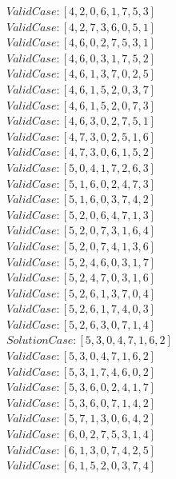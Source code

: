 \documentclass[a4paper,12pt]{article}
\begin{document}
				$Valid Case   : [4, 2, 0, 6, 1, 7, 5, 3]$\\
				$Valid Case   : [4, 2, 7, 3, 6, 0, 5, 1]$\\
				$Valid Case   : [4, 6, 0, 2, 7, 5, 3, 1]$\\
				$Valid Case   : [4, 6, 0, 3, 1, 7, 5, 2]$\\
				$Valid Case   : [4, 6, 1, 3, 7, 0, 2, 5]$\\
				$Valid Case   : [4, 6, 1, 5, 2, 0, 3, 7]$\\
				$Valid Case   : [4, 6, 1, 5, 2, 0, 7, 3]$\\
				$Valid Case   : [4, 6, 3, 0, 2, 7, 5, 1]$\\
				$Valid Case   : [4, 7, 3, 0, 2, 5, 1, 6]$\\
				$Valid Case   : [4, 7, 3, 0, 6, 1, 5, 2]$\\
				$Valid Case   : [5, 0, 4, 1, 7, 2, 6, 3]$\\
				$Valid Case   : [5, 1, 6, 0, 2, 4, 7, 3]$\\
				$Valid Case   : [5, 1, 6, 0, 3, 7, 4, 2]$\\
				$Valid Case   : [5, 2, 0, 6, 4, 7, 1, 3]$\\
				$Valid Case   : [5, 2, 0, 7, 3, 1, 6, 4]$\\
				$Valid Case   : [5, 2, 0, 7, 4, 1, 3, 6]$\\
				$Valid Case   : [5, 2, 4, 6, 0, 3, 1, 7]$\\
				$Valid Case   : [5, 2, 4, 7, 0, 3, 1, 6]$\\
				$Valid Case   : [5, 2, 6, 1, 3, 7, 0, 4]$\\
				$Valid Case   : [5, 2, 6, 1, 7, 4, 0, 3]$\\
				$Valid Case   : [5, 2, 6, 3, 0, 7, 1, 4]$\\
				$Solution Case: [5, 3, 0, 4, 7, 1, 6, 2]$\\
				$Valid Case   : [5, 3, 0, 4, 7, 1, 6, 2]$\\
				$Valid Case   : [5, 3, 1, 7, 4, 6, 0, 2]$\\
				$Valid Case   : [5, 3, 6, 0, 2, 4, 1, 7]$\\
				$Valid Case   : [5, 3, 6, 0, 7, 1, 4, 2]$\\
				$Valid Case   : [5, 7, 1, 3, 0, 6, 4, 2]$\\
				$Valid Case   : [6, 0, 2, 7, 5, 3, 1, 4]$\\
				$Valid Case   : [6, 1, 3, 0, 7, 4, 2, 5]$\\
				$Valid Case   : [6, 1, 5, 2, 0, 3, 7, 4]$\\
\end{document}
